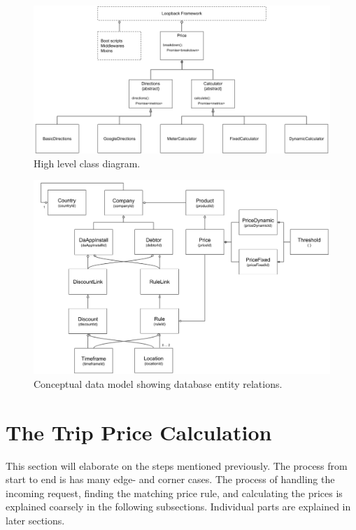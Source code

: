 \begin{figure}[H]
	\centering
	\includegraphics[width=1\textwidth]{ClassDiagram}
	\caption[Class Diagram]{High level class diagram.}
	\label{fig:Class Diagram}
\end{figure}

\begin{figure}[H]
	\centering
	\includegraphics[width=1\textwidth]{DataModel}
	\caption[Data Model]{Conceptual data model showing database entity relations.}
	\label{fig:Data Model}
\end{figure}


\section{The Trip Price Calculation}
This section will elaborate on the steps mentioned previously. The process from start to end is has many edge- and corner cases. The process of handling the incoming request, finding the matching price rule, and calculating the prices is explained coarsely in the following subsections. Individual parts are explained in later sections.

